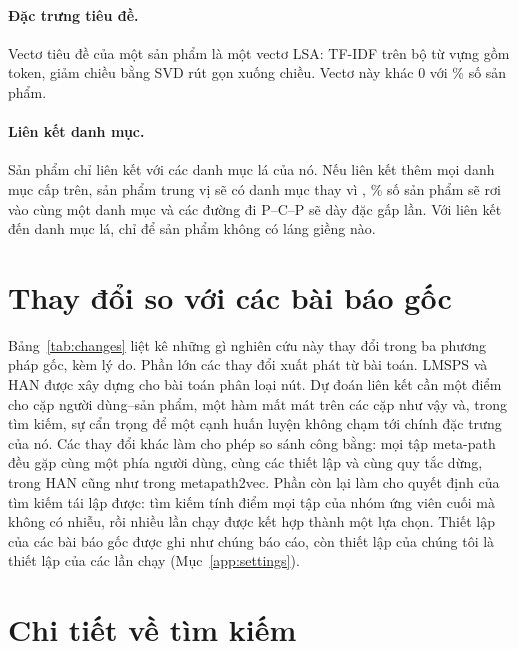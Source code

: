 \paragraph{Đặc trưng tiêu đề.} Vectơ tiêu đề của một sản phẩm là một vectơ LSA: TF-IDF trên bộ từ
vựng gồm  token, giảm chiều bằng SVD rút gọn xuống  chiều. Vectơ này
khác 0 với \% số sản phẩm.

\paragraph{Liên kết danh mục.} Sản phẩm chỉ liên kết với các danh mục lá của nó. Nếu liên kết thêm
mọi danh mục cấp trên, sản phẩm trung vị sẽ có  danh mục thay vì
, \% số sản phẩm sẽ rơi vào cùng một danh mục và
các đường đi P--C--P sẽ dày đặc gấp  lần. Với liên kết đến danh mục lá,
 chỉ để  sản phẩm không có láng giềng nào.



\section{Thay đổi so với các bài báo gốc}
\label{app:changes}

Bảng~\ref{tab:changes} liệt kê những gì nghiên cứu này thay đổi trong ba phương pháp gốc, kèm lý do.
Phần lớn các thay đổi xuất phát từ bài toán. LMSPS và HAN được xây dựng cho bài toán phân loại nút.
Dự đoán liên kết cần một điểm cho cặp người dùng--sản phẩm, một hàm mất mát trên các cặp như vậy
và, trong tìm kiếm, sự cẩn trọng để một cạnh huấn luyện không chạm tới chính đặc trưng của nó. Các
thay đổi khác làm cho phép so sánh công bằng: mọi tập meta-path đều gặp cùng một phía người dùng,
cùng các thiết lập và cùng quy tắc dừng, trong HAN cũng như trong metapath2vec. Phần còn lại làm cho
quyết định của tìm kiếm tái lập được: tìm kiếm tính điểm mọi tập của nhóm ứng viên cuối mà không có
nhiễu, rồi nhiều lần chạy được kết hợp thành một lựa chọn. Thiết lập của các bài báo gốc được ghi
như chúng báo cáo, còn thiết lập của chúng tôi là thiết lập của các lần chạy (Mục~\ref{app:settings}).



\section{Chi tiết về tìm kiếm}
\label{app:search}


